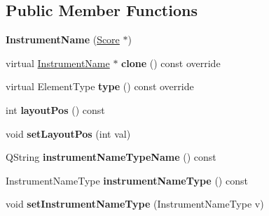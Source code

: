\subsection*{Public Member Functions}
\begin{DoxyCompactItemize}
\item 
\mbox{\label{class_ms_1_1_instrument_name_ac11d3033cbcbf32efb45a871a53e6f69}} 
{\bfseries Instrument\+Name} (\hyperlink{class_ms_1_1_score}{Score} $\ast$)
\item 
\mbox{\label{class_ms_1_1_instrument_name_a3be55445a27136cf60135310d967447c}} 
virtual \hyperlink{class_ms_1_1_instrument_name}{Instrument\+Name} $\ast$ {\bfseries clone} () const override
\item 
\mbox{\label{class_ms_1_1_instrument_name_a55d528ec324059162e7f6a7f74bfc8ce}} 
virtual Element\+Type {\bfseries type} () const override
\item 
\mbox{\label{class_ms_1_1_instrument_name_ae2067ab6b3468fa9fa59403831cac345}} 
int {\bfseries layout\+Pos} () const
\item 
\mbox{\label{class_ms_1_1_instrument_name_aeb5ca43e3aa00e6102258f0d4558c3fb}} 
void {\bfseries set\+Layout\+Pos} (int val)
\item 
\mbox{\label{class_ms_1_1_instrument_name_a685c705aed0b6d82a39d9acda9c3cf58}} 
Q\+String {\bfseries instrument\+Name\+Type\+Name} () const
\item 
\mbox{\label{class_ms_1_1_instrument_name_a23a7ac2a029d6bc5b61cc9b03c64e8dc}} 
Instrument\+Name\+Type {\bfseries instrument\+Name\+Type} () const
\item 
\mbox{\label{class_ms_1_1_instrument_name_a2c5ae5f6b2f1ffa12b4242a7bbfa7523}} 
void {\bfseries set\+Instrument\+Name\+Type} (Instrument\+Name\+Type v)
\item 
\mbox{\label{class_ms_1_1_instrument_name_a364f5871daec40b34e69b08d6b40687d}} 

\end{DoxyCompactItemize}
